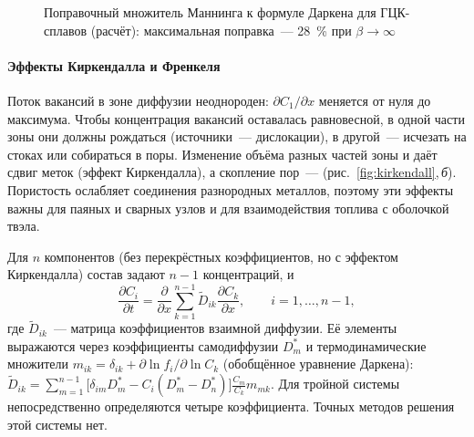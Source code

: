 \begin{figure}[ht]
\centering
{}
\caption{Поправочный множитель Маннинга к формуле Даркена для ГЦК-сплавов
(расчёт): максимальная поправка~— 28~\% при $\beta\to\infty$}
\label{fig:manning}
\end{figure}

\paragraph{Эффекты Киркендалла и Френкеля}
Поток вакансий в зоне диффузии неоднороден: $\partial C_1/\partial x$
меняется от нуля до максимума. Чтобы концентрация вакансий оставалась
равновесной, в одной части зоны они должны рождаться (источники~—
дислокации), в другой~— исчезать на стоках или собираться в поры. Изменение
объёма разных частей зоны и даёт сдвиг меток (эффект Киркендалла), а
скопление пор~—  (рис.~\ref{fig:kirkendall},\,\textit{б}).
Пористость ослабляет соединения разнородных металлов, поэтому эти
эффекты важны для паяных и сварных узлов и для взаимодействия топлива
с оболочкой твэла.

\begin{podrobnee}
Для $n$ компонентов (без перекрёстных коэффициентов, но с эффектом
Киркендалла) состав задают $n-1$ концентраций, и
\[
\frac{\partial C_i}{\partial t}=\frac{\partial}{\partial x}\sum_{k=1}^{n-1}\widetilde D_{ik}\frac{\partial C_k}{\partial x},
\qquad i=1,\ldots,n-1 ,
\]
где $\widetilde D_{ik}$~— матрица коэффициентов взаимной диффузии. Её
элементы выражаются через коэффициенты самодиффузии $D_m^*$ и
термодинамические множители $m_{ik}=\delta_{ik}+\partial\ln f_i/\partial\ln C_k$
(обобщённое уравнение Даркена):
$\widetilde D_{ik}=\sum_{m=1}^{n-1}\bigl[\delta_{im}D_m^*-C_i(D_m^*-D_n^*)\bigr]\frac{C_m}{C_k}m_{mk}$.
Для тройной системы непосредственно определяются четыре коэффициента.
Точных методов решения этой системы нет.
\end{podrobnee}
